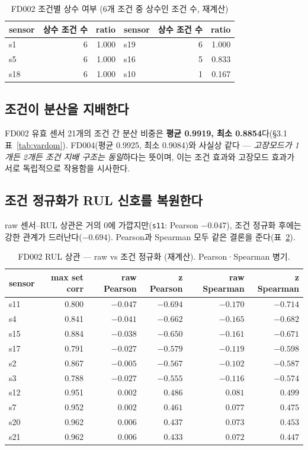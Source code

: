 \documentclass[11pt]{article}
\begin{document}
\begin{table}[H]
\centering
\caption{FD002 조건별 상수 여부 (6개 조건 중 상수인 조건 수, 재계산)}
\label{tab:fd002cond}
\begin{tabular}{lrr@{\hskip 3em}lrr}
\toprule
sensor & 상수 조건 수 & ratio & sensor & 상수 조건 수 & ratio \\
\midrule
s1  & 6 & 1.000 & s19 & 6 & 1.000 \\
s5  & 6 & 1.000 & s16 & 5 & 0.833 \\
s18 & 6 & 1.000 & s10 & 1 & 0.167 \\
\bottomrule
\end{tabular}
\end{table}

\subsection{조건이 분산을 지배한다}

FD002 유효 센서 21개의 조건 간 분산 비중은 \textbf{평균 0.9919, 최소 0.8854}다(\S3.1 표~\ref{tab:vardom}).
FD004(평균 0.9925, 최소 0.9084)와 사실상 같다 — \emph{고장모드가 1개든 2개든 조건 지배 구조는 동일}하다는 뜻이며, 이는 조건 효과와 고장모드 효과가 서로 독립적으로 작용함을 시사한다.

\subsection{조건 정규화가 RUL 신호를 복원한다}

raw 센서--RUL 상관은 거의 0에 가깝지만(\texttt{s11}: Pearson $-0.047$), 조건 정규화 후에는 강한 관계가 드러난다($-0.694$).
Pearson과 Spearman 모두 같은 결론을 준다(표~\ref{tab:fd002rul}).

\begin{table}[H]
\centering
\caption{FD002 RUL 상관 — raw vs 조건 정규화 (재계산). Pearson·Spearman 병기.}
\label{tab:fd002rul}
\begin{tabular}{lrrrrr}
\toprule
sensor & max set corr & raw Pearson & z Pearson & raw Spearman & z Spearman \\
\midrule
s11 & 0.800 & $-0.047$ & $-0.694$ & $-0.170$ & $-0.714$ \\
s4  & 0.841 & $-0.041$ & $-0.662$ & $-0.165$ & $-0.682$ \\
s15 & 0.884 & $-0.038$ & $-0.650$ & $-0.161$ & $-0.671$ \\
s17 & 0.791 & $-0.027$ & $-0.579$ & $-0.119$ & $-0.598$ \\
s2  & 0.867 & $-0.005$ & $-0.567$ & $-0.102$ & $-0.587$ \\
s3  & 0.788 & $-0.027$ & $-0.555$ & $-0.116$ & $-0.574$ \\
s12 & 0.951 & $ 0.002$ & $ 0.486$ & $ 0.081$ & $ 0.499$ \\
s7  & 0.952 & $ 0.002$ & $ 0.461$ & $ 0.077$ & $ 0.475$ \\
s20 & 0.962 & $ 0.006$ & $ 0.437$ & $ 0.073$ & $ 0.453$ \\
s21 & 0.962 & $ 0.006$ & $ 0.433$ & $ 0.072$ & $ 0.447$ \\
\bottomrule
\end{tabular}
\end{table}
\end{document}

